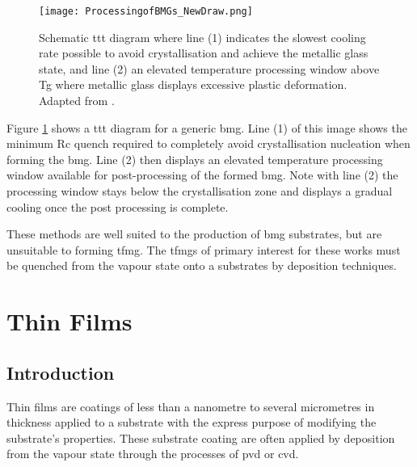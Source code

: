 \documentclass[a4paper,12pt,oneside]{report}%
\begin{document}
\begin{figure}[htb]
	\centering
	\texttt{[image: ProcessingofBMGs\_NewDraw.png]}
	\caption[Schematic \acrshort{ttt} diagram where line (1) indicates the slowest cooling rate possible to avoid crystallisation and achieve the metallic glass state, and line (2) an elevated temperature processing window above \acrshort{Tg} where metallic glass displays excessive plastic deformation.]{Schematic \acrshort{ttt} diagram where line (1) indicates the slowest cooling rate possible to avoid crystallisation and achieve the metallic glass state, and line (2) an elevated temperature processing window above \acrshort{Tg} where metallic glass displays excessive plastic deformation. Adapted from \cite{Schroers2010}.}
	\label{fig:BMGTTT}
\end{figure}

Figure \ref{fig:BMGTTT} shows a \gls{ttt} diagram for a generic \gls{bmg}. Line (1) of this image shows the minimum \gls{Rc} quench required to completely avoid crystallisation nucleation when forming the \gls{bmg}. Line (2) then displays an elevated temperature processing window available for post-processing of the formed \gls{bmg}. Note with line (2) the processing window stays below the crystallisation zone and displays a gradual cooling once the post processing is complete.

These methods are well suited to the production of \gls{bmg} substrates, but are unsuitable to forming \gls{tfmg}. The \glspl{tfmg} of primary interest for these works must be quenched from the vapour state onto a substrates by deposition techniques.

\section{Thin Films}
\subsection{Introduction}
Thin films are coatings of less than a nanometre to several micrometres in thickness applied to a substrate with the express purpose of modifying the substrate's properties. These substrate coating are often applied by deposition from the vapour state through the processes of \gls{pvd} or \gls{cvd}. 
\end{document}
